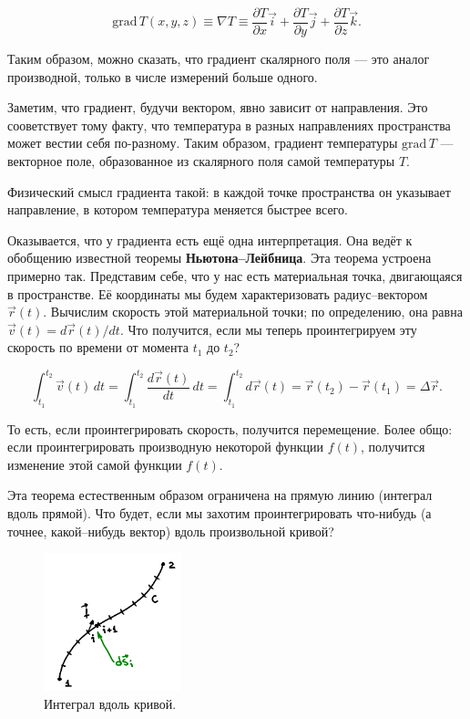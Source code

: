 \documentclass[11pt,a4paper]{article}
\numberwithin{equation}{section}
\newcommand{\pt}{\partial}
\newcommand{\grad}{\mathrm{grad}\,}
\begin{document}
\begin{equation}
  \label{eq:def_grad_2}
  \grad T (x,y,z) \equiv \nabla T \equiv \frac{\pt T}{\pt x} \vec{i} +  \frac{\pt T}{\pt y}
  \vec{j} +  \frac{\pt T}{\pt z} \vec{k}.
\end{equation}

Таким образом, можно сказать, что градиент скалярного поля --- это
аналог производной, только в числе измерений больше одного. 

Заметим, что градиент, будучи вектором, явно зависит от
направления. Это сооветствует тому факту, что температура в разных
направлениях пространства может вестии себя по-разному. Таким образом,
градиент температуры $\grad T$ --- векторное поле, образованное из скалярного
поля самой температуры $T$.

Физический смысл градиента такой: в каждой точке пространства он
указывает направление, в котором температура меняется быстрее всего. 

Оказывается, что у градиента есть ещё одна интерпретация. Она ведёт к
обобщению известной теоремы \textbf{Ньютона--Лейбница}. Эта теорема
устроена примерно так. Представим себе, что у нас есть материальная
точка, двигающаяся в пространстве. Её координаты мы будем
характеризовать радиус--вектором $\vec{r}(t)$. Вычислим скорость этой
материальной точки; по определению, она равна $\vec{v} (t) = d
\vec{r}(t) / dt$. Что получится, если мы теперь проинтегрируем эту
скорость по времени от момента $t_1$ до $t_2$? 

\begin{equation}
  \label{eq:newton_leibnitz}
  \int_{t_1}^{t_2} \vec{v}(t) \, dt = \int_{t_1}^{t_2}
  \frac{d\vec{r}(t)} {dt} \, dt = \int_{t_1}^{t_2} d\vec{r}(t) =
  \vec{r}(t_2) - \vec{r}(t_1) = \Delta \vec{r}.
\end{equation}

То есть, если проинтегрировать скорость, получится перемещение. Более
общо: если проинтегрировать производную некоторой функции $f(t)$,
получится изменение этой самой функции $f(t)$. 

Эта теорема естественным образом ограничена на прямую линию (интеграл
вдоль прямой). Что будет, если мы захотим проинтегрировать что-нибудь
(а точнее, какой--нибудь вектор) вдоль произвольной кривой? 

\begin{figure}
  \vspace{-1.2cm}
  \begin{center}
    \includegraphics[width=4cm,height=4cm]{curve_int.pdf}
  \end{center}
  \vspace{-0.7cm}
  \caption{Интеграл вдоль кривой.}
  \label{fig:curve_int}
\end{figure}
\end{document}

